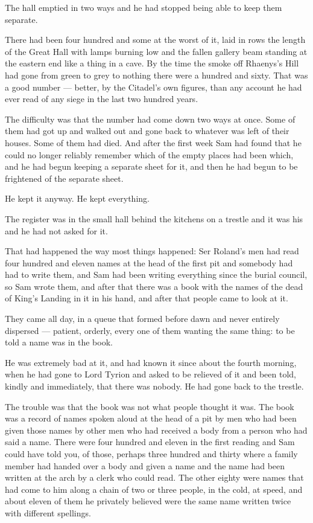 The hall emptied in two ways and he had stopped being able to keep them separate.

There had been four hundred and some at the worst of it, laid in rows the length of the Great Hall with lamps burning low and the fallen gallery beam standing at the eastern end like a thing in a cave. By the time the smoke off Rhaenys’s Hill had gone from green to grey to nothing there were a hundred and sixty. That was a good number — better, by the Citadel’s own figures, than any account he had ever read of any siege in the last two hundred years.

The difficulty was that the number had come down two ways at once. Some of them had got up and walked out and gone back to whatever was left of their houses. Some of them had died. And after the first week Sam had found that he could no longer reliably remember which of the empty places had been which, and he had begun keeping a separate sheet for it, and then he had begun to be frightened of the separate sheet.

He kept it anyway. He kept everything.

\sceneBreak

The register was in the small hall behind the kitchens on a trestle and it was his and he had not asked for it.

That had happened the way most things happened: Ser Roland’s men had read four hundred and eleven names at the head of the first pit and somebody had had to write them, and Sam had been writing everything since the burial council, so Sam wrote them, and after that there was a book with the names of the dead of King’s Landing in it in his hand, and after that people came to look at it.

They came all day, in a queue that formed before dawn and never entirely dispersed — patient, orderly, every one of them wanting the same thing: to be told a name was in the book.

He was extremely bad at it, and had known it since about the fourth morning, when he had gone to Lord Tyrion and asked to be relieved of it and been told, kindly and immediately, that there was nobody. He had gone back to the trestle.

The trouble was that the book was not what people thought it was. The book was a record of names spoken aloud at the head of a pit by men who had been given those names by other men who had received a body from a person who had said a name. There were four hundred and eleven in the first reading and Sam could have told you, of those, perhaps three hundred and thirty where a family member had handed over a body and given a name and the name had been written at the arch by a clerk who could read. The other eighty were names that had come to him along a chain of two or three people, in the cold, at speed, and about eleven of them he privately believed were the same name written twice with different spellings.

